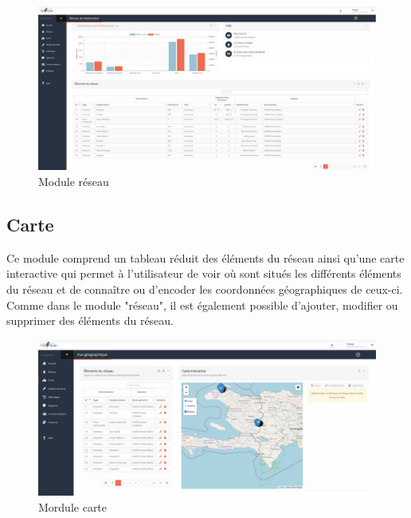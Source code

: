 \documentclass{EPL-master-thesis-covers-FR}
\begin{document}
				\begin{figure}[H]
					\centering
					\includegraphics[width=1\textwidth]{images/reseau}
					\caption{Module réseau}
				\end{figure}
				
			\subsection{Carte}
				Ce module comprend un tableau réduit des éléments du réseau ainsi qu'une carte interactive qui permet à l'utilisateur de voir où sont situés les différents éléments du réseau et de connaître ou d'encoder les coordonnées géographiques de ceux-ci. Comme dans le module "réseau", il est également possible d'ajouter, modifier ou supprimer des éléments du réseau.
				\begin{figure}[H]
					\centering
					\includegraphics[width=1\textwidth]{images/carte}
					\caption{Mordule carte}
				\end{figure}
				
\end{document}
